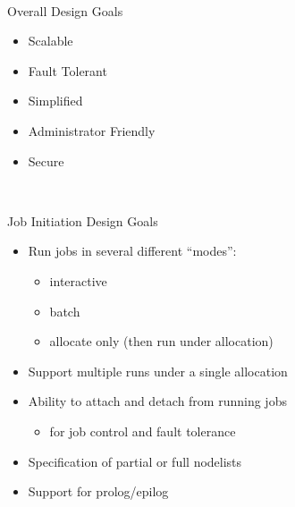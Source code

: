 \documentclass[article,letter,landscape]{seminar}
\begin{document}


\begin{slide}
  \mbox{}\\
  \begin{center}
  Overall Design Goals\\
  \begin{itemize}
     \item Scalable 
     \item Fault Tolerant
     \item Simplified 
     \item Administrator Friendly
     \item Secure
  \end{itemize}
  \end{center}
\end{slide}

\begin{slide}
  \mbox{}\\
  \begin{center}
  Job Initiation Design Goals\\
  \begin{itemize}
    \item Run jobs in several different ``modes'':
    \begin{itemize}
      \item interactive
      \item batch
      \item allocate only (then run under allocation)
    \end{itemize}
    \item Support multiple runs under a single allocation
    \item Ability to attach and detach from running jobs
    \begin{itemize}
      \item for job control and fault tolerance
    \end{itemize}
    \item Specification of partial or full nodelists
    \item Support for prolog/epilog
  \end{itemize}
  \end{center}
\end{slide}
\end{document}
